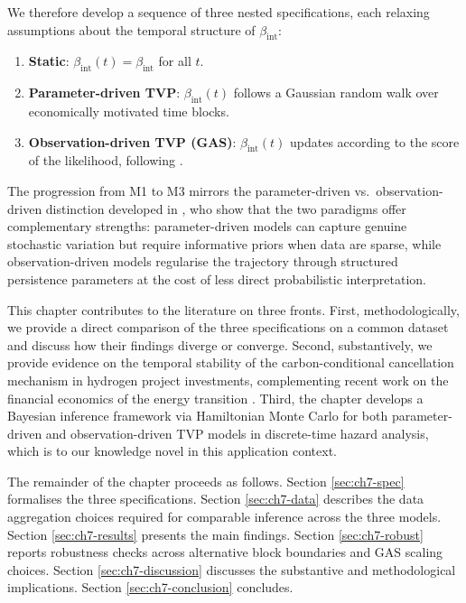 \documentclass[11pt,a4paper]{article}
\newcommand{\bint}{\beta_{\mathrm{int}}}
\begin{document}
We therefore develop a sequence of three nested specifications, each relaxing assumptions about the temporal structure of $\bint$:
\begin{enumerate}
    \item[(M1)] \textbf{Static}: $\bint(t) = \bint$ for all $t$.
    \item[(M2)] \textbf{Parameter-driven TVP}: $\bint(t)$ follows a Gaussian random walk over economically motivated time blocks.
    \item[(M3)] \textbf{Observation-driven TVP (GAS)}: $\bint(t)$ updates according to the score of the likelihood, following \citet{creal2008general, creal2013generalized}.
\end{enumerate}
The progression from M1 to M3 mirrors the parameter-driven vs.\ observation-driven distinction developed in \citet{koopman2016predicting}, who show that the two paradigms offer complementary strengths: parameter-driven models can capture genuine stochastic variation but require informative priors when data are sparse, while observation-driven models regularise the trajectory through structured persistence parameters at the cost of less direct probabilistic interpretation.

This chapter contributes to the literature on three fronts. First, methodologically, we provide a direct comparison of the three specifications on a common dataset and discuss how their findings diverge or converge. Second, substantively, we provide evidence on the temporal stability of the carbon-conditional cancellation mechanism in hydrogen project investments, complementing recent work on the financial economics of the energy transition \citep{bolton2021carbon, odenweller2022probabilistic}. Third, the chapter develops a Bayesian inference framework via Hamiltonian Monte Carlo for both parameter-driven and observation-driven TVP models in discrete-time hazard analysis, which is to our knowledge novel in this application context.

The remainder of the chapter proceeds as follows. Section \ref{sec:ch7-spec} formalises the three specifications. Section \ref{sec:ch7-data} describes the data aggregation choices required for comparable inference across the three models. Section \ref{sec:ch7-results} presents the main findings. Section \ref{sec:ch7-robust} reports robustness checks across alternative block boundaries and GAS scaling choices. Section \ref{sec:ch7-discussion} discusses the substantive and methodological implications. Section \ref{sec:ch7-conclusion} concludes.
\end{document}
